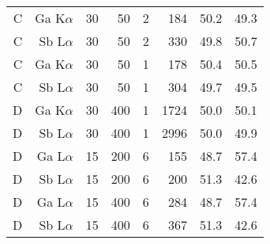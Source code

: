 \begin{table}[phtb]
\begin{center}
\begin{tabular}{rrrrrrrr}
            C               & Ga K$\alpha$       & 30             & 50             & 2           & 184               & 50.2                 & 49.3                          \\
            C               & Sb L$\alpha$       & 30             & 50             & 2           & 330               & 49.8                 & 50.7                          \\
            C               & Ga K$\alpha$       & 30             & 50             & 1           & 178               & 50.4                 & 50.5                          \\
            C               & Sb L$\alpha$       & 30             & 50             & 1           & 304               & 49.7                 & 49.5                          \\
            \hline
            D               & Ga K$\alpha$       & 30             & 400            & 1           & 1724              & 50.0                 & 50.1                          \\
            D               & Sb L$\alpha$       & 30             & 400            & 1           & 2996              & 50.0                 & 49.9                          \\
            D               & Ga L$\alpha$       & 15             & 200            & 6           & 155               & 48.7                 & 57.4                          \\
            D               & Sb L$\alpha$       & 15             & 200            & 6           & 200               & 51.3                 & 42.6                          \\
            D               & Ga L$\alpha$       & 15             & 400            & 6           & 284               & 48.7                 & 57.4                          \\
            D               & Sb L$\alpha$       & 15             & 400            & 6           & 367               & 51.3                 & 42.6                          \\
            \hline
        \end{tabular}
    \end{center}
\end{table}
